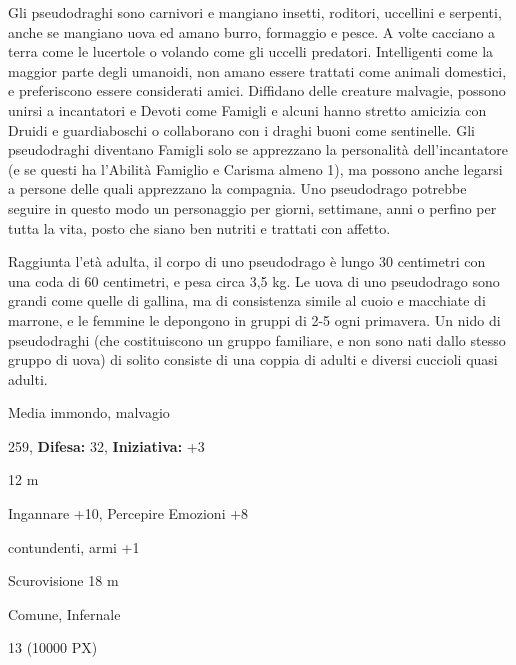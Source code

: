 \begin{multicols}{2}
{Gli pseudodraghi sono carnivori e mangiano insetti, roditori, uccellini e serpenti, anche se mangiano uova ed amano burro, formaggio e pesce. A volte cacciano a terra come le lucertole o volando come gli uccelli predatori. Intelligenti come la maggior parte degli umanoidi, non amano essere trattati come animali domestici, e preferiscono essere considerati amici. Diffidano delle creature malvagie, possono unirsi a incantatori e Devoti come Famigli e alcuni hanno stretto amicizia con Druidi e guardiaboschi o collaborano con i draghi buoni come sentinelle. Gli pseudodraghi diventano Famigli solo se apprezzano la personalità dell'incantatore (e se questi ha l'Abilità Famiglio e Carisma almeno 1), ma possono anche legarsi a persone delle quali apprezzano la compagnia. Uno pseudodrago potrebbe seguire in questo modo un personaggio per giorni, settimane, anni o perfino per tutta la vita, posto che siano ben nutriti e trattati con affetto.

Raggiunta l'età adulta, il corpo di uno pseudodrago è lungo 30 centimetri con una coda di 60 centimetri, e pesa circa 3,5 kg. Le uova di uno pseudodrago sono grandi come quelle di gallina, ma di consistenza simile al cuoio e macchiate di marrone, e le femmine le depongono in gruppi di 2-5 ogni primavera. Un nido di pseudodraghi (che costituiscono un gruppo familiare, e non sono nati dallo stesso gruppo di uova) di solito consiste di una coppia di adulti e diversi cuccioli quasi adulti.


\noindent
\begin{description}[noitemsep, topsep=0pt, parsep=0pt, partopsep=0pt, leftmargin=0cm, labelwidth=2.2cm]
	\item[\textbf{Taglia/Tipo:}] Media immondo, malvagio
	\item[\textbf{Caratt.:}] 
	\item[\textbf{Punti Ferita:}] 259,  \textbf{Difesa:} 32,  \textbf{Iniziativa:} +3
	\item[\textbf{Movimento:}] 12 m
	\item[\textbf{Tiri Salvez.:}] 
	\item[\textbf{Comp.:}] Ingannare +10, Percepire Emozioni +8
	\item[\textbf{Imm. Danni:}] contundenti, armi +1
	\item[\textbf{Sensi:}] Scurovisione 18 m
	\item[\textbf{Linguaggi:}] Comune, Infernale
	\item[\textbf{Sfida:}] 13 (10000 PX)\smallskip
\end{description}

}
\end{multicols}
